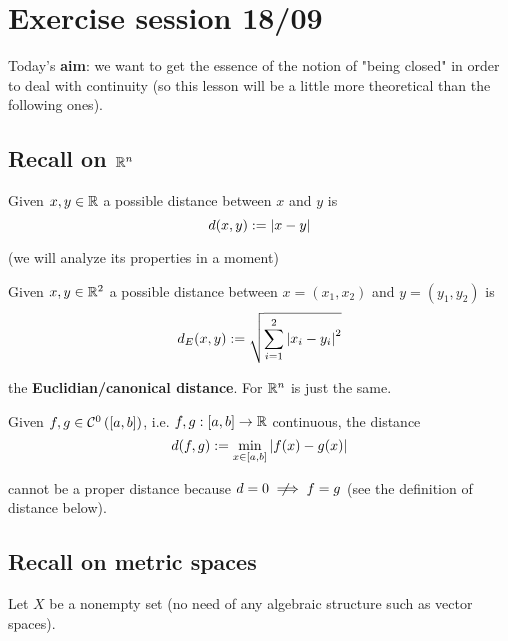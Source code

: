 
\chapter{Exercise session 18/09} %
\label{cha:exercise_session_18_09}
\thispagestyle{empty}

Today's \textbf{aim}: we want to get the essence of the notion of "being closed" in order to deal with continuity (so this lesson will be a little more theoretical than the following ones).

\section{Recall on \texorpdfstring{$\mathbb{R}^n$}{C}} %
\label{sec:recall_on_rr^n_c_}

Given $x,y\in\mathbb{R}$ a possible distance between $x$ and $y$ is
\begin{equation*}
    d(x,y):=\left\lvert x-y \right\rvert
\end{equation*}

(we will analyze its properties in a moment)

Given $x,y\in\mathbb{R}^2$ a possible distance between $x=(x_1,x_2)$ and $y=(y_1,y_2)$ is
\begin{equation*}
    d_E(x,y):=\sqrt{\sum_{i=1}^2\left\lvert x_i-y_i \right\rvert^2}
\end{equation*}

the \textbf{Euclidian/canonical distance}. For $\mathbb{R}^n$ is just the same.

Given $f,g\in\mathcal{C}^0\left([a,b] \right)$, i.e. $f,g:[a,b]\to\mathbb{R}$ continuous, the distance
\begin{equation*}
    d(f,g):=\min_{x\in[a,b]} \left\lvert f(x)-g(x) \right\rvert
\end{equation*}

cannot be a proper distance because $d=0 \notimplies f=g$ (see the definition of distance below).



\newpage

\section{Recall on metric spaces} %
\label{sec:recall_on_metric_spaces}

Let $X$ be a nonempty set (no need of any algebraic structure such as vector spaces).

